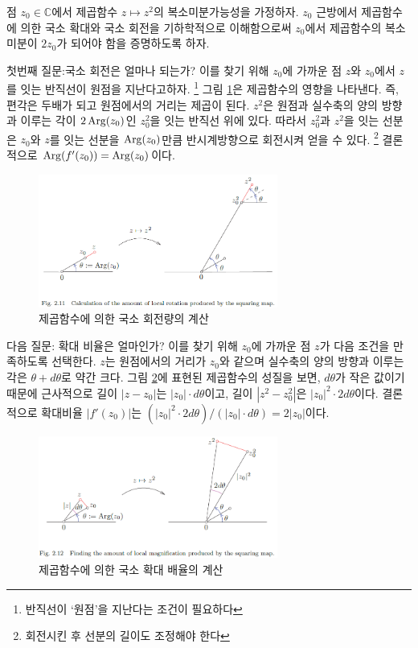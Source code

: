 \begin{salt_example} \label{example-2-12}
점 $z_0\in\mathbb C$에서 제곱함수  $z\mapsto z^2$의
복소미분가능성을 가정하자.
$z_0$ 근방에서 제곱함수에 의한  국소 확대와 국소 회전을 기하학적으로 이해함으로써
$z_0$에서 제곱함수의 복소미분이 $2z_0$가 되어야 함을 증명하도록 하자.

첫번째 질문:국소 회전은 얼마나 되는가?
이를 찾기 위해 $z_0$에 가까운 점 $z$와 $z_0$에서 $z$를 잇는 반직선이 원점을 지난다고하자.
\footnote{반직선이 `원점'을 지난다는 조건이 필요하다}
그림 \ref{fig-2-11}은 제곱함수의 영향을 나타낸다. 즉, 편각은 두배가 되고
원점에서의 거리는 제곱이 된다. 
 $z^2$은 원점과 
실수축의 양의 방향과 이루는 각이 $2\mathop{\mathrm{Arg}}(z_0)$인
$z_0^2$을 잇는 반직선 위에 있다.
따라서 $z_0^2$과 $z^2$을 잇는 선분은 
$z_0$와  $z$를 잇는 선분을 $\mathop{\mathrm{Arg}}(z_0)$만큼 반시계방향으로 회전시켜 얻을 수 있다. 
\footnote{회전시킨 후 선분의 길이도 조정해야 한다}
결론적으로  $\mathop{\mathrm{Arg}}(f'(z_0)) = \mathop{\mathrm{Arg}}(z_0)$이다.

\begin{figure}[!h]
\begin{center}
\includegraphics[width=0.7\textwidth]{./SaltChapter/fig-2-11}
\end{center}
\caption{제곱함수에 의한 국소 회전량의 계산}
\label{fig-2-11}
\end{figure}


다음 질문: 확대 비율은 얼마인가?
이를 찾기 위해 $z_0$에 가까운 점 $z$가 다음 조건을 만족하도록 선택한다.
$z$는 원점에서의 거리가 $z_0$와 같으며 
실수축의 양의 방향과 이루는 각은 $\theta + d\theta$로 약간 크다.
그림 \ref{fig-2-12}에 표현된 제곱함수의 성질을 보면,
$d\theta$가 작은 값이기 때문에 근사적으로 길이 $|z-z_0|$는  $|z_0|\cdot d\theta$이고,
길이 $|z^2-z_0^2|$은 $|z_0|^2\cdot 2d\theta$이다.
결론적으로 확대비율 $|f'(z_0)|$는 $(|z_0|^2\cdot 2d\theta)/(|z_0|\cdot d\theta) = 2|z_0|$이다.


\begin{figure}[!h]
\begin{center}
\includegraphics[width=0.7\textwidth]{./SaltChapter/fig-2-12}
\end{center}
\caption{제곱함수에 의한 국소 확대 배율의 계산}
\label{fig-2-12}
\end{figure}


\end{salt_example}
